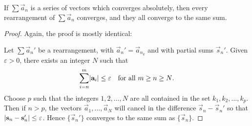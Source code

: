 \begin{thm}
  If $\sum\vec{a}_n$ is a series of vectors which converges
  absolutely, then every rearrangement of $\sum\vec{a}_n$ converges,
  and they all converge to the same sum.
\end{thm}
\begin{proof}
  Again, the proof is mostly identical:

  Let $\sum\vec{a}_n'$ be a rearrangement, with
  $\vec{a}_n' = \vec{a}_{n_k}$ and with partial sums
  $\vec{s}_n'$. Given $\varepsilon > 0$, there exists an integer $N$
  such that
  \begin{equation*}
    \sum_{i=n}^m\lvert{\mathbf{a}_i}\rvert\leq\varepsilon
    \quad\text{for all $m\geq n\geq N$}.
  \end{equation*}
  Choose $p$ such that the integers $1,2,\dots,N$ are all contained in
  the set $k_1,k_2,\dots,k_p$. Then if $n>p$, the vectors
  $\vec{a}_1,\dots,\vec{a}_N$ will cancel in the difference
  $\vec{s}_n - \vec{s}_n'$ so that
  $\lvert{\mathbf{s}_n - \mathbf{s}_n'}\rvert\leq\varepsilon$. Hence
  $\{\vec{s}_n'\}$ converges to the same sum as $\{\vec{s}_n\}$.
\end{proof}

